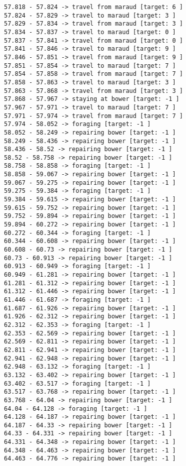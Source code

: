 \documentclass[11pt]{article}
\begin{document}
\begin{Verbatim}[commandchars=\\\{\}]
57.818 - 57.824 -> travel from maraud [target: 6 ]
57.824 - 57.829 -> travel to maraud [target: 3 ]
57.829 - 57.834 -> travel from maraud [target: 3 ]
57.834 - 57.837 -> travel to maraud [target: 0 ]
57.837 - 57.841 -> travel from maraud [target: 0 ]
57.841 - 57.846 -> travel to maraud [target: 9 ]
57.846 - 57.851 -> travel from maraud [target: 9 ]
57.851 - 57.854 -> travel to maraud [target: 7 ]
57.854 - 57.858 -> travel from maraud [target: 7 ]
57.858 - 57.863 -> travel to maraud [target: 3 ]
57.863 - 57.868 -> travel from maraud [target: 3 ]
57.868 - 57.967 -> staying at bower [target: -1 ]
57.967 - 57.971 -> travel to maraud [target: 7 ]
57.971 - 57.974 -> travel from maraud [target: 7 ]
57.974 - 58.052 -> foraging [target: -1 ]
58.052 - 58.249 -> repairing bower [target: -1 ]
58.249 - 58.436 -> repairing bower [target: -1 ]
58.436 - 58.52 -> repairing bower [target: -1 ]
58.52 - 58.758 -> repairing bower [target: -1 ]
58.758 - 58.858 -> foraging [target: -1 ]
58.858 - 59.067 -> repairing bower [target: -1 ]
59.067 - 59.275 -> repairing bower [target: -1 ]
59.275 - 59.384 -> foraging [target: -1 ]
59.384 - 59.615 -> repairing bower [target: -1 ]
59.615 - 59.752 -> repairing bower [target: -1 ]
59.752 - 59.894 -> repairing bower [target: -1 ]
59.894 - 60.272 -> repairing bower [target: -1 ]
60.272 - 60.344 -> foraging [target: -1 ]
60.344 - 60.608 -> repairing bower [target: -1 ]
60.608 - 60.73 -> repairing bower [target: -1 ]
60.73 - 60.913 -> repairing bower [target: -1 ]
60.913 - 60.949 -> foraging [target: -1 ]
60.949 - 61.281 -> repairing bower [target: -1 ]
61.281 - 61.312 -> repairing bower [target: -1 ]
61.312 - 61.446 -> repairing bower [target: -1 ]
61.446 - 61.687 -> foraging [target: -1 ]
61.687 - 61.926 -> repairing bower [target: -1 ]
61.926 - 62.312 -> repairing bower [target: -1 ]
62.312 - 62.353 -> foraging [target: -1 ]
62.353 - 62.569 -> repairing bower [target: -1 ]
62.569 - 62.811 -> repairing bower [target: -1 ]
62.811 - 62.941 -> repairing bower [target: -1 ]
62.941 - 62.948 -> repairing bower [target: -1 ]
62.948 - 63.132 -> foraging [target: -1 ]
63.132 - 63.402 -> repairing bower [target: -1 ]
63.402 - 63.517 -> foraging [target: -1 ]
63.517 - 63.768 -> repairing bower [target: -1 ]
63.768 - 64.04 -> repairing bower [target: -1 ]
64.04 - 64.128 -> foraging [target: -1 ]
64.128 - 64.187 -> repairing bower [target: -1 ]
64.187 - 64.33 -> repairing bower [target: -1 ]
64.33 - 64.331 -> repairing bower [target: -1 ]
64.331 - 64.348 -> repairing bower [target: -1 ]
64.348 - 64.463 -> repairing bower [target: -1 ]
64.463 - 64.776 -> repairing bower [target: -1 ]

\end{Verbatim}
\end{document}
